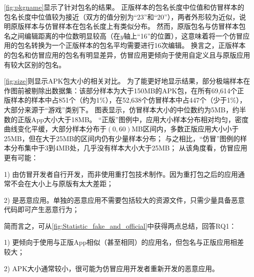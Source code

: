 \autoref{fig:pkgname}显示了针对包名的结果。
正版样本的包名长度中位值和仿冒样本的包名长度中位值较为接近（双方的值分别为``23''和``20''），两者外形较为近似，说明原版样本与仿冒样本在包名长度上有类似分布。
然而，原版包名与仿冒样本包名之间编辑距离的中位数明显较高（在$y$轴上``16''的位置），这意味着将一个仿冒应用的包名转换为一个正版样本的包名平均需要进行16次编辑。
换言之，正版样本的包名和仿冒应用的包名有明显差异，仿冒应用更倾向于使用自定义且与原版应用有较大区别的包名。

\autoref{fig:size}则显示APK包大小的相关对比。
为了能更好地显示结果，部分极端样本在作图前被剔除出数据集：该部分样本为大于150MB的APK包，在所有69,614个正版样本的样本中占851个（约为1\%），在52,638个仿冒样本中占447个（少于1\%），大部分来源于``游戏''类别下。
图表显示，仿冒样本大小的中位数约为5MB，约半数的正版App大小大于18MB。
``正版''图例中，应用大小样本分布相对均匀，密度曲线变化平缓，大部分样本分布于$(0, 60)$MB区间内，多数正版应用大小小于25MB，但在大于25MB的区间内仍有少量样本分布；
与之相比，``仿冒''图例的样本分布集中于3到4MB处，几乎没有样本大小大于25MB；
从该角度看，仿冒应用更有可能：

1) 由仿冒开发者自行开发，而非使用重打包技术制作。因为重打包之后的应用通常不会在大小上与原版有太大差距；

2) 是恶意应用。单独的恶意应用不需要包括较大的资源文件，只需少量具备恶意代码即可产生恶意行为；

\vspace{1mm}

简而言之，可从\autoref{fig:Statistic_fake_and_official}中获得两点总结，回答RQ1：

1) 更倾向于使用与正版App相似（甚至相同）的应用名，但包名与正版应用相差较大；

2) APK大小通常较小，很可能为仿冒应用开发者重新开发的恶意应用。
\vspace{1mm}


